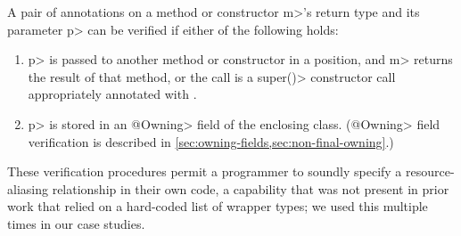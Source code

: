 A pair of \MustCallAlias annotations on a method or constructor \<m>'s return type
and its parameter \<p> can be verified if either of the following holds:
\begin{enumerate}
\item \<p> is passed to another method or constructor in a
  \MustCallAlias position, and \<m> returns the result of that method,
  or the call is a \<super()> constructor call appropriately annotated
  with \MustCallAlias.
\item \<p> is stored in an \<@Owning> field of the enclosing class.  (\<@Owning>
field verification is described in \cref{sec:owning-fields,sec:non-final-owning}.)
\end{enumerate}
These verification procedures permit a programmer to soundly specify a resource-aliasing
relationship in their own code, a capability that was not present in prior work
that relied on a hard-coded list of wrapper types; we used this
multiple times
in our case studies.



